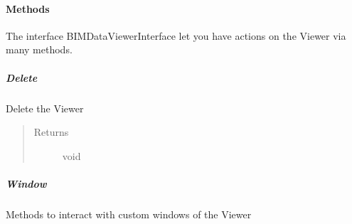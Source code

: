 \documentclass[a4paper,12pt,english]{sphinxmanual}
\begin{document}
\paragraph{Methods}
\label{\detokenize{viewer/parameters:methods}}
The interface BIMDataViewerInterface let you have actions on the Viewer via many methods.


\subparagraph{Delete}
\label{\detokenize{viewer/parameters:delete}}

\begin{fulllineitems}
\label{\detokenize{viewer/parameters:BIMDataViewer.drop}}
Delete the Viewer
\begin{quote}\begin{description}
\item[{Returns}] \leavevmode
void

\end{description}\end{quote}

\end{fulllineitems}



\subparagraph{Window}
\label{\detokenize{viewer/parameters:window}}
Methods to interact with custom windows of the Viewer
\end{document}
